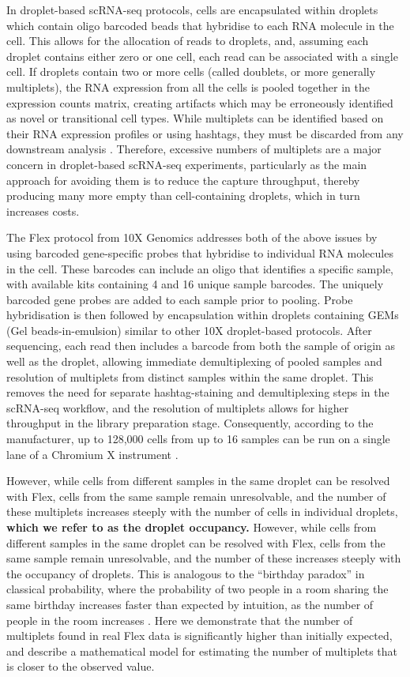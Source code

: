 \documentclass[unnumsec,webpdf,modern,large]{oup-authoring-template}
\begin{document}
	In droplet-based scRNA-seq protocols, cells are encapsulated within droplets which contain oligo barcoded beads that hybridise to each RNA molecule in the cell. 
	This allows for the allocation of reads to droplets, and, assuming each droplet contains either zero or one cell, each read can be associated with a single cell. 
	If droplets contain two or more cells (called doublets, or more generally multiplets), the RNA expression from all the cells is pooled together in the expression counts matrix, creating artifacts which may be erroneously identified as novel or transitional cell types. 
	While multiplets can be identified based on their  RNA expression profiles or using hashtags, they must be discarded from any downstream analysis
	\citep{Neavin2024}.
	Therefore, excessive numbers of multiplets are a major concern in droplet-based scRNA-seq experiments, particularly as the main approach for  avoiding them is to reduce the capture throughput, thereby producing many more empty than cell-containing droplets, which in turn increases costs.
	
	The Flex protocol from 10X Genomics addresses both of the above issues by using barcoded gene-specific probes that hybridise to individual RNA molecules in the cell. 
	These barcodes can include an oligo that identifies a specific sample, with available kits containing 4 and 16 unique sample barcodes. 
	The uniquely barcoded gene probes are added to each sample prior to pooling. 
	Probe hybridisation is then followed by encapsulation within droplets containing GEMs (Gel beads-in-emulsion) similar to other 10X droplet-based protocols. 
	After sequencing, each read then includes a barcode from both the sample of origin as well as the droplet, allowing immediate demultiplexing of pooled samples and resolution of multiplets from distinct samples within the same droplet. 
	This removes the need for separate hashtag-staining and demultiplexing steps in the scRNA-seq workflow, and the resolution of multiplets allows for higher throughput in the library preparation stage. 
	Consequently, according to the manufacturer, up to 128,000 cells from up to 16 samples can be run on a single lane of a Chromium X instrument 
	\citep{10X_flex_protocol}. 
	
	However, while cells from different samples in the same droplet can be resolved with Flex, cells from the same sample remain unresolvable, and the number of these multiplets increases steeply with the number of cells in individual droplets, \textbf{which we refer to as the droplet occupancy.}
	However, while cells from different samples in the same droplet can be resolved with Flex, cells from the same sample remain unresolvable, and the number of these increases steeply with the occupancy of droplets. 
	This is analogous to the ``birthday paradox” in classical probability, where the probability of two people in a room sharing the same birthday increases faster than expected by intuition, as the number of people in the room increases
	\citep{Mulqueen2021}.
	Here we demonstrate that the number of multiplets found in real Flex data is significantly higher than initially expected, and describe a mathematical model for estimating the number of multiplets that is closer to the observed value. 
\end{document}
